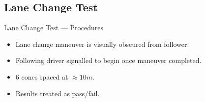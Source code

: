 \documentclass{beamer}
\begin{document}
  \subsection{Lane Change Test}

    \begin{frame}{Lane Change Test --- Procedures}
      \vspace{-30pt}
      \begin{figure}
        
      \end{figure}
      \vspace{-40pt}
      \begin{itemize} \small
        \item Lane change maneuver is visually obscured from follower.
        \item Following driver signalled to begin once maneuver completed.
        \item 6 cones spaced at $\approx10m$.
        \item Results treated as pass/fail.
      \end{itemize}
    \end{frame}
    
\end{document}
